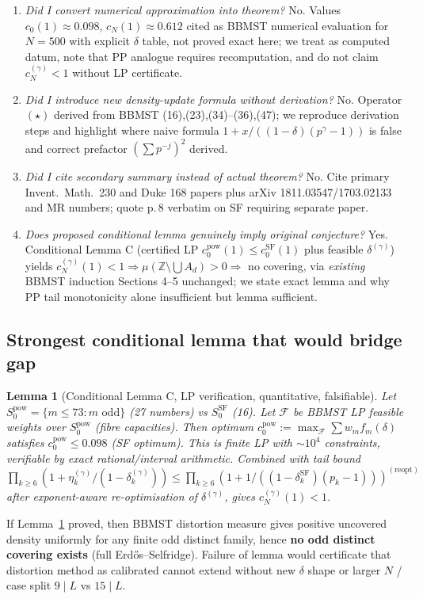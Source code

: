 \documentclass[11pt,a4paper]{article}
\theoremstyle{plain}
\newtheorem{lemma}[theorem]{Lemma}
\theoremstyle{definition}
\theoremstyle{remark}
\newcommand{\Z}{\mathbb{Z}}
\newcommand{\cN}{c_{N}}
\newcommand{\cO}{c_{0}}
\begin{document}
\begin{enumerate}[label=\textbf{\arabic*.}]
\item \emph{Did I convert numerical approximation into theorem?} No. Values $\cO(1)\approx0.098$, $\cN(1)\approx0.612$ cited as BBMST numerical evaluation for $N=500$ with explicit $\delta$ table, not proved exact here; we treat as computed datum, note that PP analogue requires recomputation, and do not claim $\cN^{(\gamma)}<1$ without LP certificate.

\item \emph{Did I introduce new density-update formula without derivation?} No. Operator $(\star)$ derived from BBMST (16),(23),(34)--(36),(47); we reproduce derivation steps and highlight where naive formula $1+x/((1-\delta)(p^{\gamma}-1))$ is false and correct prefactor $(\sum p^{-j})^{2}$ derived.

\item \emph{Did I cite secondary summary instead of actual theorem?} No. Cite primary Invent.\ Math.\ 230 and Duke 168 papers plus arXiv 1811.03547/1703.02133 and MR numbers; quote p.\,8 verbatim on SF requiring separate paper.

\item \emph{Does proposed conditional lemma genuinely imply original conjecture?} Yes. Conditional Lemma C (certified LP $\cO^{\mathrm{pow}}(1)\le\cO^{\mathrm{SF}}(1)$ plus feasible $\delta^{(\gamma)}$) yields $\cN^{(\gamma)}(1)<1\Rightarrow\mu(\Z\setminus\bigcup A_{d})>0\Rightarrow$ no covering, via \emph{existing} BBMST induction Sections 4--5 unchanged; we state exact lemma and why PP tail monotonicity alone insufficient but lemma sufficient.
\end{enumerate}

\subsection{Strongest conditional lemma that would bridge gap}

\begin{lemma}[Conditional Lemma C, LP verification, quantitative, falsifiable]\label{lem:condC}
Let $S_{0}^{\mathrm{pow}}=\{m\le73:m\text{ odd}\}$ (27 numbers) vs $S_{0}^{\mathrm{SF}}$ (16). Let $\mathcal F$ be BBMST LP feasible weights over $S_{0}^{\mathrm{pow}}$ (fibre capacities). Then optimum $\cO^{\mathrm{pow}}:=\max_{\mathcal F}\sum w_{m}f_{m}(\delta)$ satisfies $\cO^{\mathrm{pow}}\le0.098$ (SF optimum). This is finite LP with $\sim10^{4}$ constraints, verifiable by exact rational/interval arithmetic. Combined with tail bound $\prod_{k\ge6}(1+\eta_{k}^{(\gamma)}/(1-\delta_{k}^{(\gamma)}))\le\prod_{k\ge6}(1+1/((1-\delta_{k}^{\mathrm{SF}})(p_{k}-1)))^{(\text{reopt})}$ after exponent-aware re-optimisation of $\delta^{(\gamma)}$, gives $\cN^{(\gamma)}(1)<1$.
\end{lemma}
If Lemma~\ref{lem:condC} proved, then BBMST distortion measure gives positive uncovered density uniformly for any finite odd distinct family, hence \textbf{no odd distinct covering exists} (full Erd\H{o}s--Selfridge). Failure of lemma would certificate that distortion method as calibrated cannot extend without new $\delta$ shape or larger $N$ / case split $9\mid L$ vs $15\mid L$.
\end{document}
